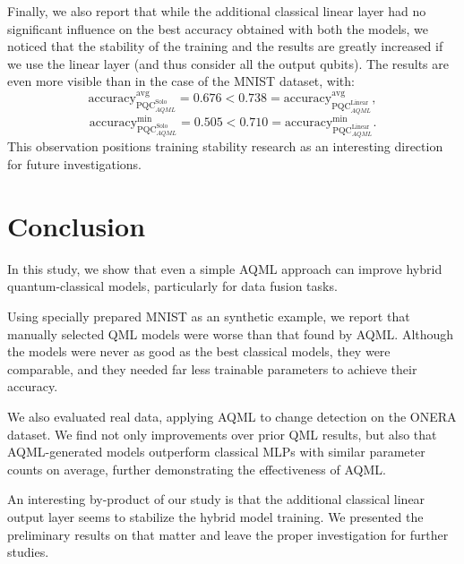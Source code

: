 \documentclass[runningheads]{llncs}
\begin{document}
Finally, we also report that while the additional classical linear layer had no significant influence on the best
accuracy obtained with both the models, we noticed that the stability of the training and the results are greatly
increased if we use the linear layer (and thus consider all the output qubits). The results are even more visible
than in the case of the MNIST dataset, with:
\begin{equation}
	\mathrm{accuracy}^{\mathrm{avg}}_{\mathrm{PQC}^{\mathrm{Solo}}_{AQML}}
	= 0.676 < 0.738 =
	\mathrm{accuracy}^{\mathrm{avg}}_{\mathrm{PQC}^{\mathrm{Linear}}_{AQML}},
\end{equation}
\begin{equation}
	\mathrm{accuracy}^{\mathrm{min}}_{\mathrm{PQC}^{\mathrm{Solo}}_{AQML}}
	= 0.505 < 0.710 =
	\mathrm{accuracy}^{\mathrm{min}}_{\mathrm{PQC}^{\mathrm{Linear}}_{AQML}}.
\end{equation}
This observation positions training stability research as an interesting direction for future investigations.




\section{Conclusion}
\label{sec:conclusions}

In this study, we show that even a simple AQML approach can improve hybrid quantum-classical models,
particularly for data fusion tasks.

Using specially prepared MNIST as an synthetic example, we report that manually selected QML models were worse than
that found by AQML. Although the models were never as good as the best classical models, they were comparable, and
they needed far less trainable parameters to achieve their accuracy.

We also evaluated real data, applying AQML to change detection on the ONERA dataset. We find not only improvements over prior
QML results, but also that AQML-generated models outperform classical MLPs with similar parameter counts on average,
further demonstrating the effectiveness of AQML.

An interesting by-product of our study is that the additional classical linear output layer seems to stabilize the
hybrid model training. We presented the preliminary results on that matter and leave the proper investigation for
further studies.
\end{document}
